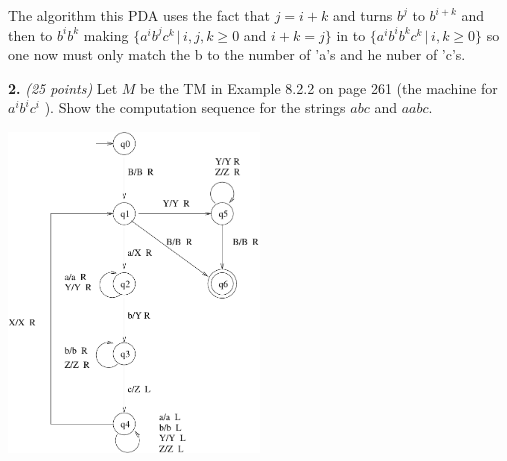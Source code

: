 \documentclass[12pt]{article}
\begin{document}
The algorithm this PDA uses the fact that $j= i+k $ and turns $b^{j}$ to $b^{i+k}$ and then to $b^{i}b^{k}$ making $\{ a^i b^j c^k  \,|\, i,j,k \geq 0$ and $i + k = j \}$ in to $\{ a^i b^{i} b^{k} c^k  \,|\, i,k \geq 0\}$ so one now must only match the b to the number of 'a's and he nuber of 'c's.


{\bf 2.} {\em (25 points)} Let $M$ be the TM in Example 8.2.2 on page
261 (the machine for $a^i b^i c^i$ ).
Show the computation sequence for the strings $abc$ and $aabc$.

\begin{center}
\includegraphics[width=0.50\textwidth]{example-8-2-2.pdf}
\end{center}
\end{document}
